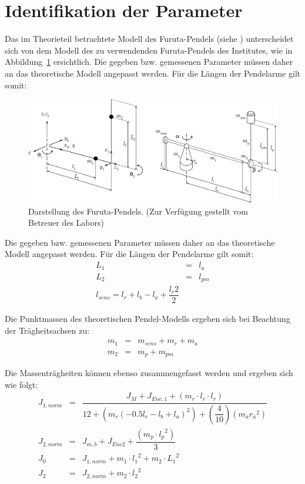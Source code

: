 \section{Identifikation der Parameter}
\label{sec.Parameter}

Das im Theorieteil betrachtete Modell des Furuta-Pendels (siehe \cite{Cazzolato.2011}) unterscheidet sich von dem Modell des zu verwendenden Furuta-Pendels des Institutes, wie in Abbildung~\ref{fig.FurutaPlant} ersichtlich.
Die gegeben bzw. gemessenen Parameter müssen daher an das theoretische Modell angepasst werden. Für die Längen der Pendelarme gilt somit:

\begin{figure}[htbp]
	\centering
	\includegraphics[width=1.\textwidth]{Grafiken/adelaideimagenew}
	\caption{Darstellung des Furuta-Pendels. (Zur Verfügung gestellt vom Betreuer des Labors) }
	\label{fig.FurutaPlant}
\end{figure}

Die gegeben bzw. gemessenen Parameter müssen daher an das theoretische Modell angepasst werden. Für die Längen der Pendelarme gilt somit:
\begin{eqnarray}
L_1 &=& l_a \nonumber \\
L_2 &=& l_{pm} \nonumber \\
l_{sens}=l_r+l_b-l_a+\dfrac{l_c2}{2}
\end{eqnarray}

Die Punktmassen des theoretischen Pendel-Modells ergeben sich bei Beachtung der Trägheitsachsen zu:
\begin{eqnarray}
m_1 &=& m_{sens}+m_r+m_a \nonumber \\
m_2 &=& m_p+m_{pm}
\end{eqnarray}

Die Massenträgheiten können ebenso zusammengefasst werden und ergeben sich wie folgt:
\begin{eqnarray*}
J_{1,norm}&=&\dfrac{J_M +J_{Enc,1}+(m_r \cdot l_r \cdot l_r)}{12+(m_r (-0.5 l_r-l_b+l_a)^2)+(\dfrac{4}{10}) (m_a  {r_a}^{2})} \\
J_{2,norm}&=& J_{m,b}+J_{Enc2}   + \dfrac{(m_p \cdot {l_p}^{2})}{3} \\
J_0&=&J_{1,norm}+ m_1 \cdot {l_1}^{2} + m_2 \cdot {L_1}^{2} \\ 
J_2&=&J_{2,norm}+m_2 \cdot {l_2}^2           \\
\end{eqnarray*}

